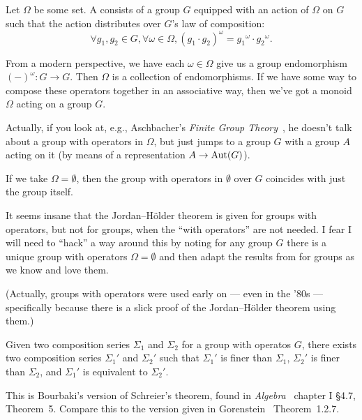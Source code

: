 \begin{definition}
Let $\Omega$ be some set. A 
consists of a group $G$ equipped with an action of $\Omega$ on $G$ such
that the action distributes over $G$'s law of composition:
\begin{equation}
  \forall g_{1},g_{2}\in G,\forall\omega\in\Omega,
  (g_{1}\cdot g_{2})^{\omega} = {g_{1}}^{\omega}\cdot{g_{2}}^{\omega}.
\end{equation}
\end{definition}

\begin{def-remark}
From a modern perspective, we have each $\omega\in\Omega$ give us a
group endomorphism $(-)^{\omega}\colon G\to G$. Then $\Omega$ is a
collection of endomorphisms. If we have some way to compose these
operators together in an associative way, then we've got a monoid
$\Omega$ acting on a group $G$.

Actually, if you look at, e.g., Aschbacher's \emph{Finite Group Theory}~\cite{aschbacher2000finite},
he doesn't talk about a group with operators in $\Omega$, but just jumps
to a group $G$ with a group $A$ acting on it (by means of a
representation $A\to\operatorname{Aut}(G)$). 
\end{def-remark}

\begin{def-remark}
If we take $\Omega=\emptyset$, then the group with operators in
$\emptyset$ over $G$ coincides with just the group itself.
\end{def-remark}

\begin{def-remark}
It seems insane that the Jordan--H\"older theorem is given for groups
with operators, but not for groups, when the ``with operators'' are not
needed. I fear I will need to ``hack'' a way around this by noting for
any group $G$ there is a unique group with operators $\Omega=\emptyset$
and then adapt the results from  for groups as we know and
love them.

(Actually, groups with operators were used early on --- even in the '80s
--- specifically because there is a slick proof of the Jordan--H\"older
theorem using them.)
\end{def-remark}

\begin{theorem}
Given two composition series $\Sigma_{1}$ and $\Sigma_{2}$ for a group
with operatos $G$, there exists two composition series $\Sigma_{1}'$ and $\Sigma_{2}'$
such that $\Sigma_{1}'$ is finer than $\Sigma_{1}$, $\Sigma_{2}'$ is
finer than $\Sigma_{2}$, and $\Sigma_{1}'$ is equivalent to $\Sigma_{2}'$.
\end{theorem}

\begin{thm-remark}
This is Bourbaki's version of Schreier's theorem, found in \emph{Algebra}~\cite{bourbaki1974elements}
chapter I \S4{.}7, Theorem~5. Compare this to the version given in
Gorenstein~\cite{gorenstein1980finite} Theorem~1{.}2{.}7.
\end{thm-remark}
